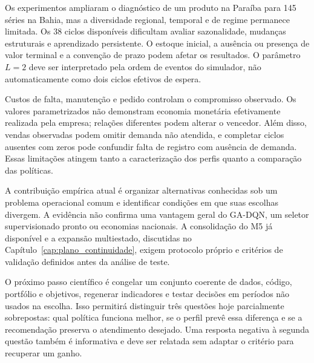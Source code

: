 Os experimentos ampliaram o diagnóstico de um produto na Paraíba para 145 séries na Bahia, mas a diversidade regional, temporal e de regime permanece limitada. Os 38 ciclos disponíveis dificultam avaliar sazonalidade, mudanças estruturais e aprendizado persistente. O estoque inicial, a ausência ou presença de valor terminal e a convenção de prazo podem afetar os resultados. O parâmetro $L=2$ deve ser interpretado pela ordem de eventos do simulador, não automaticamente como dois ciclos efetivos de espera.

Custos de falta, manutenção e pedido controlam o compromisso observado. Os valores parametrizados não demonstram economia monetária efetivamente realizada pela empresa; relações diferentes podem alterar o vencedor. Além disso, vendas observadas podem omitir demanda não atendida, e completar ciclos ausentes com zeros pode confundir falta de registro com ausência de demanda. Essas limitações atingem tanto a caracterização dos perfis quanto a comparação das políticas.

A contribuição empírica atual é organizar alternativas conhecidas sob um problema operacional comum e identificar condições em que suas escolhas divergem. A evidência não confirma uma vantagem geral do GA-DQN, um seletor supervisionado pronto ou economias nacionais. A consolidação do M5 já disponível e a expansão multiestado, discutidas no Capítulo~\ref{cap:plano_continuidade}, exigem protocolo próprio e critérios de validação definidos antes da análise de teste.

O próximo passo científico é congelar um conjunto coerente de dados, código, portfólio e objetivos, regenerar indicadores e testar decisões em períodos não usados na escolha. Isso permitirá distinguir três questões hoje parcialmente sobrepostas: qual política funciona melhor, se o perfil prevê essa diferença e se a recomendação preserva o atendimento desejado. Uma resposta negativa à segunda questão também é informativa e deve ser relatada sem adaptar o critério para recuperar um ganho.
